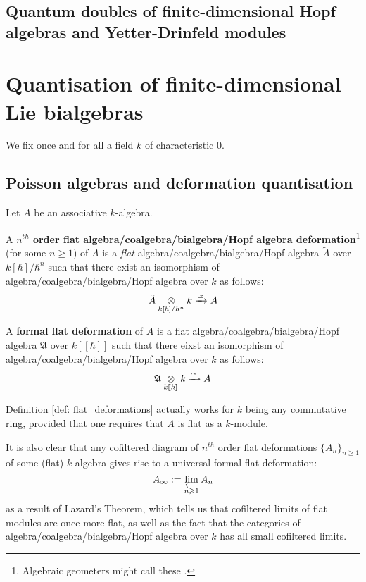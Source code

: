     \subsection{Quantum doubles of finite-dimensional Hopf algebras and Yetter-Drinfeld modules}
    
\section{Quantisation of finite-dimensional Lie bialgebras}
    \begin{convention}
        We fix once and for all a field $k$ of characteristic $0$. 
    \end{convention}
    
    \subsection{Poisson algebras and deformation quantisation}
        \begin{definition} \label{def: flat_deformations}
            Let $A$ be an associative $k$-algebra.
            
            A \textbf{$n^{th}$ order flat algebra/coalgebra/bialgebra/Hopf algebra deformation}\footnote{Algebraic geometers might call these .} (for some $n \geq 1$) of $A$ is a \textit{flat} algebra/coalgebra/bialgebra/Hopf algebra $\tilde{A}$ over $k[\hbar]/\hbar^n$ such that there exist an isomorphism of algebra/coalgebra/bialgebra/Hopf algebra over $k$ as follows:
                $$\tilde{A} \tensor_{k[\hbar]/\hbar^n} k \xrightarrow[]{\cong} A$$
                
            A \textbf{formal flat deformation} of $A$ is a flat algebra/coalgebra/bialgebra/Hopf algebra $\mathfrak{A}$ over $k[\![\hbar]\!]$ such that there eixst an isomorphism of algebra/coalgebra/bialgebra/Hopf algebra over $k$ as follows:
                $$\mathfrak{A} \tensor_{k[\![\hbar]\!]} k \xrightarrow[]{\cong} A$$
        \end{definition}
        \begin{remark}
            Definition \ref{def: flat_deformations} actually works for $k$ being any commutative ring, provided that one requires that $A$ is flat as a $k$-module. 
            
            It is also clear that any cofiltered diagram of $n^{th}$ order flat deformations $\{A_n\}_{n \geq 1}$ of some (flat) $k$-algebra gives rise to a universal formal flat deformation:
                $$A_{\infty} := \projlim_{n \geq 1} A_n$$
            as a result of Lazard's Theorem, which tells us that cofiltered limits of flat modules are once more flat, as well as the fact that the categories of algebra/coalgebra/bialgebra/Hopf algebra over $k$ has all small cofiltered limits. 
        \end{remark}
